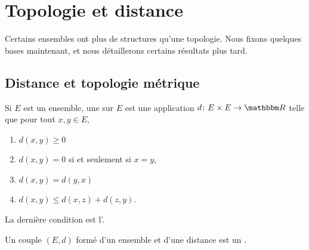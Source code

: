 
\section{Topologie et distance}
Certains ensembles ont plus de structures qu'une topologie. Nous fixons quelques bases maintenant, et nous détaillerons certains résultats plus tard.

\subsection{Distance et topologie métrique}

\begin{definition}  \label{DefMVNVFsX}
    Si $E$ est un ensemble, une  sur $E$ est une application $d\colon E\times E\to \eR$ telle que pour tout $x,y\in E$,
    \begin{enumerate}

    \item
    $d(x,y)\geq 0$

    \item
    $d(x,y)=0$ si et seulement si $x=y$,

    \item
    $d(x,y)=d(y,x)$

    \item
    $d(x,y)\leq d(x,z)+d(z,y)$.

    \end{enumerate}
    La dernière condition est l'.

    Un couple \((E,d)\) formé d'un ensemble et d'une distance est un .
\end{definition}

